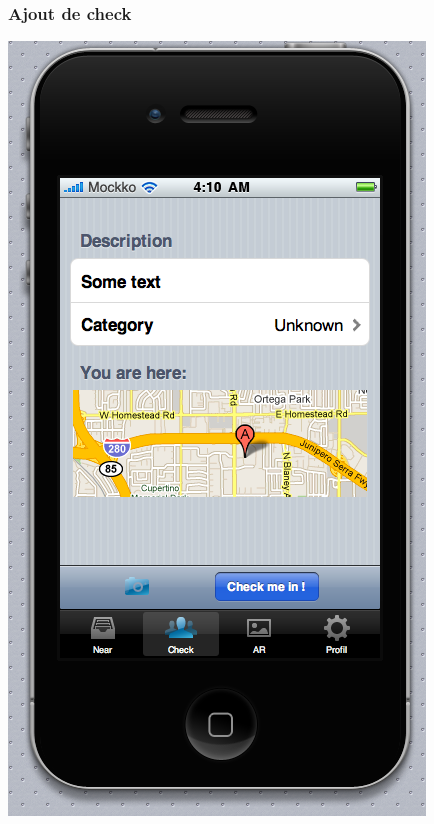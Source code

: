 \documentclass[a4paper,12pt]{report}
\begin{document}
\begin{onehalfspace}
\subsubsection{Ajout de check}
\includegraphics[height=\thehauteurscreen cm]{img/3_check.png}


\end{onehalfspace}
\end{document}
